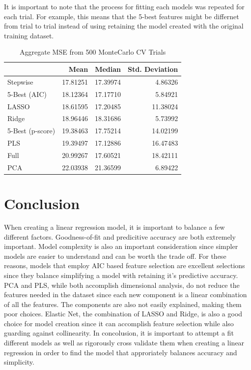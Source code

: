 \documentclass[12pt,letterpaper]{article}
\begin{document}
It is important to note that the process for fitting each models was repeated for each trial. For example, this means that the 5-best features might be differnet from trial to trial instead of using retaining the model created with the original training dataset. 

\begin{table}

  \caption{Aggregate MSE from 500 MonteCarlo CV Trials}
  \centering
  \begin{tabular}[h]{|l|r|r|r|}
  \hline
    & Mean & Median & Std. Deviation\\
  \hline
  Stepwise & 17.81251 & 17.39974 & 4.86326\\
  \hline
  5-Best (AIC) & 18.12364 & 17.17710 & 5.84921\\
  \hline
  LASSO & 18.61595 & 17.20485 & 11.38024\\
  \hline
  Ridge & 18.96446 & 18.31686 & 5.73992\\
  \hline
  5-Best (p-score) & 19.38463 & 17.75214 & 14.02199\\
  \hline
  PLS & 19.39497 & 17.12886 & 16.47483\\
  \hline
  Full & 20.99267 & 17.60521 & 18.42111\\
  \hline
  PCA & 22.03938 & 21.36599 & 6.89422\\
  \hline
  \end{tabular}
  \label{tab:mc_cv}

\end{table}

\section*{Conclusion}

When creating a linear regression model, it is important to balance a few different factors. Goodness-of-fit and predicitive accuracy are both extremely important. Model complexity is also an important consideration since simpler models are easier to understand and can be worth the trade off. For these reasons, models that employ AIC based feature selection are excellent selections since they balance simplifying a model with retaining it's predictive accuracy. PCA and PLS, while both accomplish dimensional analysis, do not reduce the features needed in the dataset since each new component is a linear combination of all the features. The components are also not easily explained, making them poor choices. Elastic Net, the combination of LASSO and Ridge, is also a good choice for model creation since it can accomplish feature selection while also guarding against collinearity. In concolusion, it is important to attempt a fit different models as well as rigorously cross validate them when creating a linear regression in order to find the model that approriately balances accuracy and simplicity. 
\end{document}
